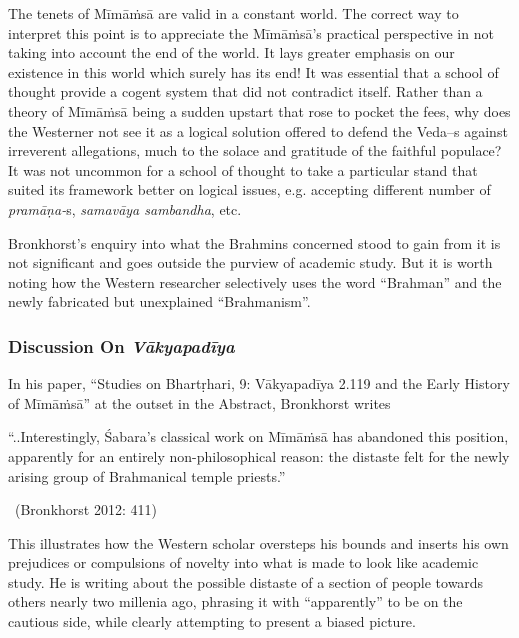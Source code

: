 The tenets of Mīmāṁsā are valid in a constant world. The correct way to interpret this point is to appreciate the Mīmāṁsā’s practical perspective in not taking into account the end of the world. It lays greater emphasis on our existence in this world which surely has its end! It was essential that a school of thought provide a cogent system that did not contradict itself. Rather than a theory of Mīmāṁsā being a sudden upstart that rose to pocket the fees, why does the Westerner not see it as a logical solution offered to defend the Veda--s against irreverent allegations, much to the solace and gratitude of the faithful populace? It was not uncommon for a school of thought to take a particular stand that suited its framework better on logical issues, e.g. accepting different number of \textit{pramāṇa-}s, \textit{samavāya sambandha}, etc.

Bronkhorst’s enquiry into what the Brahmins concerned stood to gain from it is not significant and goes outside the purview of academic study. But it is worth noting how the Western researcher selectively uses the word “Brahman” and the newly fabricated but unexplained “Brahmanism”.

\vspace{-.3cm}

\subsubsection*{Discussion On \textit{Vākyapadīya}}

In his paper, “Studies on Bhartṛhari, 9: Vākyapadīya 2.119 and the Early History of Mīmāṁsā” at the outset in the Abstract, Bronkhorst writes

\begin{myquote}
“..Interestingly, Śabara’s classical work on Mīmāṁsā has abandoned this position, apparently for an entirely non-philosophical reason: the distaste felt for the newly arising group of Brahmanical temple priests.” 

~\hfill (Bronkhorst 2012: 411)
\end{myquote}

This illustrates how the Western scholar oversteps his bounds and inserts his own prejudices or compulsions of novelty into what is made to look like academic study. He is writing about the possible distaste of a section of people towards others nearly two millenia ago, phrasing it with “apparently” to be on the cautious side, while clearly attempting to present a biased picture.


